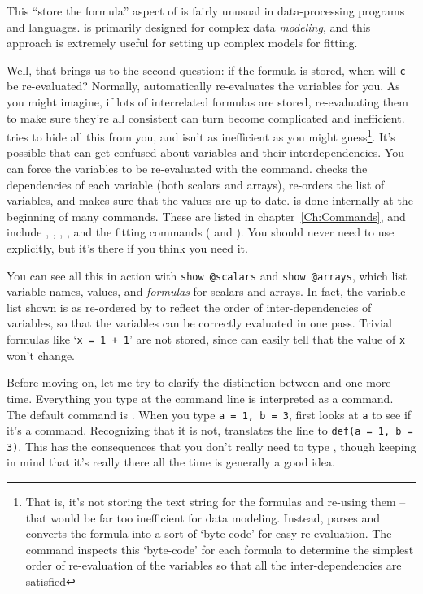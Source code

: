 This ``store the formula'' aspect of {\ifeffit} is fairly unusual in
data-processing programs and languages.  {\ifeffit} is primarily designed
for complex data {\emph{modeling}}, and this approach is extremely useful
for setting up complex models for fitting.

Well, that brings us to the second question: if the formula is stored,
when will {\tt{c}} be re-evaluated?  Normally, {\ifeffit}
automatically re-evaluates the variables for you.  As you might
imagine, if lots of interrelated formulas are stored, re-evaluating
them to make sure they're all consistent can turn become complicated
and inefficient.  {\ifeffit} tries to hide all this from you, and
isn't as inefficient as you might guess{\footnote{That is, it's not
storing the text string for the formulas and re-using them -- that
would be far too inefficient for data modeling.  Instead, {\ifeffit}
parses and converts the formula into a sort of `byte-code' for easy
re-evaluation.  The {} command inspects this `byte-code'
for each formula to determine the simplest order of re-evaluation of
the variables so that all the inter-dependencies are satisfied}}.
It's possible that {\ifeffit} can get confused about variables and
their interdependencies.  You can force the variables to be
re-evaluated with the {} command.  {} checks the
dependencies of each variable (both scalars and arrays), re-orders the
list of variables, and makes sure that the values are up-to-date.
{} is done internally at the beginning of many {\ifeffit}
commands.  These are listed in chapter~\ref{Ch:Commands}, and include
{}, {}, {}, {}, and
the fitting commands ({} and {}).  You should
never need to use {} explicitly, but it's there if you think
you need it.

You can see all this in action with {\tt{show @scalars}} and {\tt{show
    @arrays}}, which list variable names, values, and {\emph{formulas}} for
scalars and arrays.  In fact, the variable list shown is as re-ordered by
{} to reflect the order of inter-dependencies of variables, so
that the variables can be correctly evaluated in one pass.  Trivial
formulas like `{\tt{x = 1 + 1}}' are not stored, since {\ifeffit} can
easily tell that the value of {\tt{x}} won't change.

Before moving on, let me try to clarify the distinction between
{} and {} one more time.  Everything you type at the
command line is interpreted as a command.  The default command is
{}.  When you type {\tt{a = 1, b = 3}}, {\ifeffit} first looks at
{\tt{a}} to see if it's a command.  Recognizing that it is not, {\ifeffit}
translates the line to {\tt{def(a = 1, b = 3)}}.  This has the consequences
that you don't really need to type {}, though keeping in mind
that it's really there all the time is generally a good idea.

